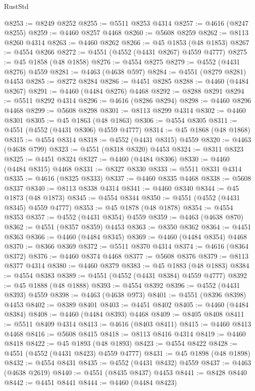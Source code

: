 \begin{lexlean}{RustStd}
\begin{coremodule}
@8253 := @8249 @8252
@8255 := @5511 @8253 @4314
@8257 := @4616 (@8247 @8255)
@8259 := @4460 @8257 @4468
@8260 := @5608 @8259
@8262 := @8113 @8260 @4314
@8263 := @4460 @8262
@8266 := @45 @1853 (@48 @1853)
@8267 := @4554 @8266
@8272 := @4551 (@4552 (@4431 @8267) @4559 @4777)
@8275 := @45 @1858 (@48 @1858)
@8276 := @4554 @8275
@8279 := @4552 (@4431 @8276) @4559
@8281 := @4463 (@4638 @597)
@8284 := @4551 (@8279 @8281) @4453
@8285 := @8272 @8284
@8286 := @4451 @8285
@8288 := @4460 (@4484 @8267)
@8291 := @4460 (@4484 @8276) @4468
@8292 := @8288 @8291
@8294 := @5511 @8292 @4314
@8296 := @4616 (@8286 @8294)
@8298 := @4460 @8296 @4468
@8299 := @5608 @8298
@8301 := @8113 @8299 @4314
@8302 := @4460 @8301
@8305 := @45 @1863 (@48 @1863)
@8306 := @4554 @8305
@8311 := @4551 (@4552 (@4431 @8306) @4559 @4777)
@8314 := @45 @1868 (@48 @1868)
@8315 := @4554 @8314
@8318 := @4552 (@4431 @8315) @4559
@8320 := @4463 (@4638 @799)
@8323 := @4551 (@8318 @8320) @4453
@8324 := @8311 @8323
@8325 := @4451 @8324
@8327 := @4460 (@4484 @8306)
@8330 := @4460 (@4484 @8315) @4468
@8331 := @8327 @8330
@8333 := @5511 @8331 @4314
@8335 := @4616 (@8325 @8333)
@8337 := @4460 @8335 @4468
@8338 := @5608 @8337
@8340 := @8113 @8338 @4314
@8341 := @4460 @8340
@8344 := @45 @1873 (@48 @1873)
@8345 := @4554 @8344
@8350 := @4551 (@4552 (@4431 @8345) @4559 @4777)
@8353 := @45 @1878 (@48 @1878)
@8354 := @4554 @8353
@8357 := @4552 (@4431 @8354) @4559
@8359 := @4463 (@4638 @870)
@8362 := @4551 (@8357 @8359) @4453
@8363 := @8350 @8362
@8364 := @4451 @8363
@8366 := @4460 (@4484 @8345)
@8369 := @4460 (@4484 @8354) @4468
@8370 := @8366 @8369
@8372 := @5511 @8370 @4314
@8374 := @4616 (@8364 @8372)
@8376 := @4460 @8374 @4468
@8377 := @5608 @8376
@8379 := @8113 @8377 @4314
@8380 := @4460 @8379
@8383 := @45 @1883 (@48 @1883)
@8384 := @4554 @8383
@8389 := @4551 (@4552 (@4431 @8384) @4559 @4777)
@8392 := @45 @1888 (@48 @1888)
@8393 := @4554 @8392
@8396 := @4552 (@4431 @8393) @4559
@8398 := @4463 (@4638 @973)
@8401 := @4551 (@8396 @8398) @4453
@8402 := @8389 @8401
@8403 := @4451 @8402
@8405 := @4460 (@4484 @8384)
@8408 := @4460 (@4484 @8393) @4468
@8409 := @8405 @8408
@8411 := @5511 @8409 @4314
@8413 := @4616 (@8403 @8411)
@8415 := @4460 @8413 @4468
@8416 := @5608 @8415
@8418 := @8113 @8416 @4314
@8419 := @4460 @8418
@8422 := @45 @1893 (@48 @1893)
@8423 := @4554 @8422
@8428 := @4551 (@4552 (@4431 @8423) @4559 @4777)
@8431 := @45 @1898 (@48 @1898)
@8432 := @4554 @8431
@8435 := @4552 (@4431 @8432) @4559
@8437 := @4463 (@4638 @2619)
@8440 := @4551 (@8435 @8437) @4453
@8441 := @8428 @8440
@8442 := @4451 @8441
@8444 := @4460 (@4484 @8423)

\end{coremodule}
\end{lexlean}
